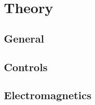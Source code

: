 \chapter{Theory}\label{ch:theory}

\section{General}







\section{Controls}


\section{Electromagnetics}




